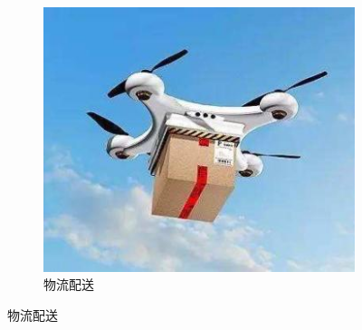 \begin{figure}[!htbp]
\begin{subfigure}[t]{0.3\textwidth}
\begin{minipage}[b]{1\linewidth}
        \end{minipage}
    \end{subfigure}
    \begin{subfigure}[t]{0.275\textwidth}
        \captionsetup{justification=centering}
        \begin{minipage}[b]{1\linewidth}
            \includegraphics[width=\textwidth]{./images/物流配送.png}
            \caption{物流配送}
        \end{minipage}
    \end{subfigure}


\end{figure}

